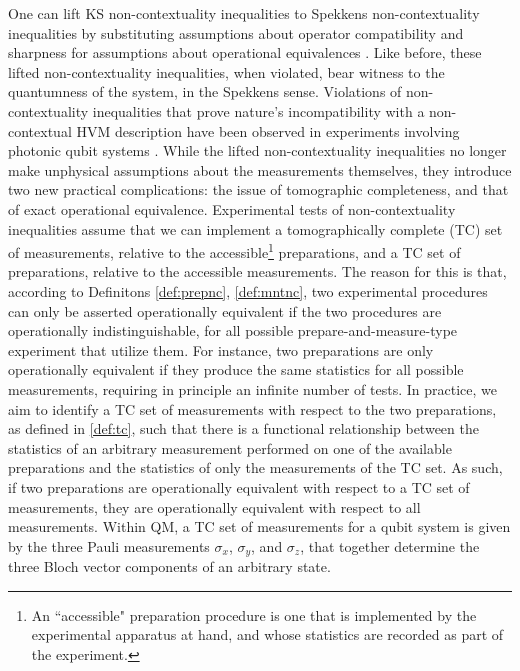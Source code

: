 One can lift KS non-contextuality inequalities to Spekkens non-contextuality inequalities by substituting assumptions about operator compatibility and sharpness for assumptions about operational equivalences \cite{Kunjwal2019}. Like before, these lifted non-contextuality inequalities, when violated, bear witness to the quantumness of the system, in the Spekkens sense. Violations of non-contextuality inequalities that prove nature's incompatibility with a non-contextual HVM description have been observed in experiments involving photonic qubit systems \cite{Mazurek2016}. While the lifted non-contextuality inequalities no longer make unphysical assumptions about the measurements themselves, they introduce two new practical complications: the issue of tomographic completeness, and that of exact operational equivalence. Experimental tests of non-contextuality inequalities assume that we can implement a tomographically complete (TC) set of measurements, relative to the accessible\footnote{An ``accessible" preparation procedure is one that is implemented by the experimental apparatus at hand, and whose statistics are recorded as part of the experiment.} preparations, and a TC set of preparations, relative to the accessible measurements. The reason for this is that, according to Definitons \ref{def:prepnc}, \ref{def:mntnc}, two experimental procedures can only be asserted operationally equivalent if the two procedures are operationally indistinguishable, for all possible prepare-and-measure-type experiment that utilize them. For instance, two preparations are only operationally equivalent if they produce the same statistics for all possible measurements, requiring in principle an infinite number of tests. In practice, we aim to identify a TC set of measurements with respect to the two preparations, as defined in \ref{def:tc}, such that there is a functional relationship between the statistics of an arbitrary measurement performed on one of the available preparations and the statistics of only the measurements of the TC set. As such, if two preparations are operationally equivalent with respect to a TC set of measurements, they are operationally equivalent with respect to all measurements. Within QM, a TC set of measurements for a qubit system is given by the three Pauli measurements $\sigma_x$, $\sigma_y$, and $\sigma_z$, that together determine the three Bloch vector components of an arbitrary state.

